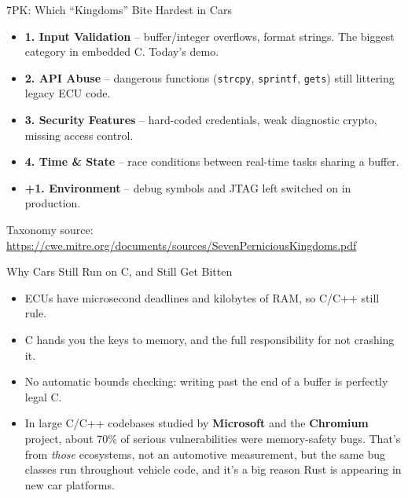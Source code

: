 
\begin{frame}{7PK: Which ``Kingdoms'' Bite Hardest in Cars}
  \begin{itemize}
    \item \textbf{1. Input Validation} -- buffer/integer overflows, format strings. The biggest category in embedded C. \alert{Today's demo.}
    \item \textbf{2. API Abuse} -- dangerous functions (\texttt{strcpy}, \texttt{sprintf}, \texttt{gets}) still littering legacy ECU code.
    \item \textbf{3. Security Features} -- hard-coded credentials, weak diagnostic crypto, missing access control.
    \item \textbf{4. Time \& State} -- race conditions between real-time tasks sharing a buffer.
    \item \textbf{+1. Environment} -- debug symbols and JTAG left switched on in production.
  \end{itemize}
  {\scriptsize Taxonomy source: \url{https://cwe.mitre.org/documents/sources/SevenPerniciousKingdoms.pdf}}
\end{frame}

\begin{frame}{Why Cars Still Run on C, and Still Get Bitten}
  \begin{itemize}
    \item ECUs have microsecond deadlines and kilobytes of RAM, so C/C++ still rule.
    \item C hands you the keys to memory, and the full responsibility for not crashing it.
    \item No automatic bounds checking: writing past the end of a buffer is perfectly legal C.
    \item In large C/C++ codebases studied by \textbf{Microsoft} and the \textbf{Chromium} project, about \alert{70\%} of serious vulnerabilities were memory-safety bugs. That's from \emph{those} ecosystems, not an automotive measurement, but the same bug classes run throughout vehicle code, and it's a big reason Rust is appearing in new car platforms.
  \end{itemize}
\end{frame}

